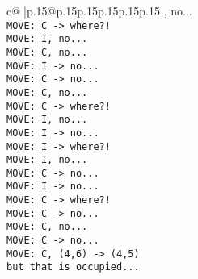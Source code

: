 \documentclass{article}
\begin{document}
{\begin{supertabular}{c@{$\;$}|p{.15\linewidth}@{}p{.15\linewidth}p{.15\linewidth}p{.15\linewidth}p{.15\linewidth}p{.15\linewidth}}
{{{, no...\\ \tt  MOVE: C -> where?!\\ \tt  MOVE: I, no...\\ \tt  MOVE: C, no...\\ \tt  MOVE: I -> no...\\ \tt  MOVE: C -> no...\\ \tt  MOVE: C, no...\\ \tt  MOVE: C -> where?!\\ \tt  MOVE: I, no...\\ \tt  MOVE: I -> no...\\ \tt  MOVE: I -> where?!\\ \tt  MOVE: I, no...\\ \tt  MOVE: C -> no...\\ \tt  MOVE: I -> no...\\ \tt  MOVE: C -> where?!\\ \tt  MOVE: C -> no...\\ \tt  MOVE: C, no...\\ \tt  MOVE: C -> no...\\ \tt  MOVE: C, (4,6) -> (4,5) \\ \tt  but that is occupied...\\ \tt }}}
\end{supertabular}}
\end{document}

